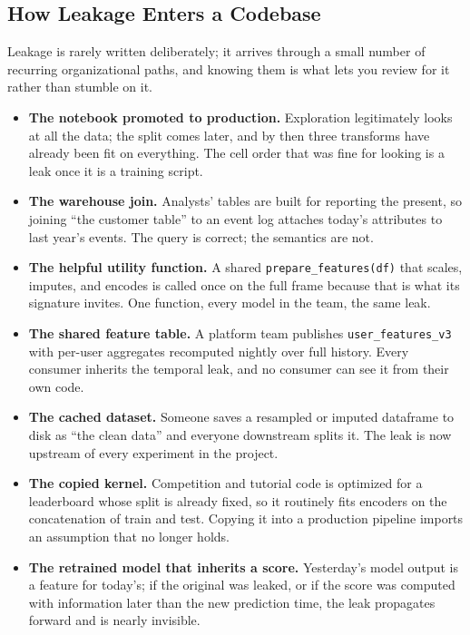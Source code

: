 \subsection{How Leakage Enters a Codebase}

Leakage is rarely written deliberately; it arrives through a small number of recurring organizational paths, and knowing them is what lets you review for it rather than stumble on it.

\begin{itemize}
    \item \textbf{The notebook promoted to production.} Exploration legitimately looks at all the data; the split comes later, and by then three transforms have already been fit on everything. The cell order that was fine for looking is a leak once it is a training script.
    \item \textbf{The warehouse join.} Analysts' tables are built for reporting the present, so joining ``the customer table'' to an event log attaches today's attributes to last year's events. The query is correct; the semantics are not.
    \item \textbf{The helpful utility function.} A shared \texttt{prepare\_features(df)} that scales, imputes, and encodes is called once on the full frame because that is what its signature invites. One function, every model in the team, the same leak.
    \item \textbf{The shared feature table.} A platform team publishes \texttt{user\_features\_v3} with per-user aggregates recomputed nightly over full history. Every consumer inherits the temporal leak, and no consumer can see it from their own code.
    \item \textbf{The cached dataset.} Someone saves a resampled or imputed dataframe to disk as ``the clean data'' and everyone downstream splits it. The leak is now upstream of every experiment in the project.
    \item \textbf{The copied kernel.} Competition and tutorial code is optimized for a leaderboard whose split is already fixed, so it routinely fits encoders on the concatenation of train and test. Copying it into a production pipeline imports an assumption that no longer holds.
    \item \textbf{The retrained model that inherits a score.} Yesterday's model output is a feature for today's; if the original was leaked, or if the score was computed with information later than the new prediction time, the leak propagates forward and is nearly invisible.
\end{itemize}

